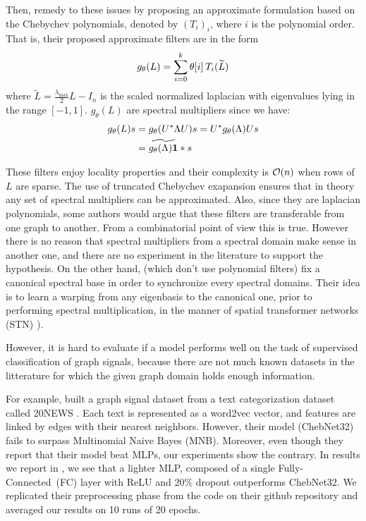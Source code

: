 Then, \cite{defferrard2016convolutional} remedy to these issues by proposing an approximate formulation based on the Chebychev polynomials, denoted by $(T_i)_i$, where $i$ is the polynomial order.
That is, their proposed approximate filters are in the form
\begin{gather}
g_\theta(L) = \sum_{i=0}^k \theta[i] \h{2} T_i(\widetilde{L})
\end{gather}
where $\widetilde{L} = \frac{\lambda_{\max}}2L - I_n$ is the scaled normalized laplacian with eigenvalues lying in the range $[-1,1]$. $g_\theta(L)$ are spectral multipliers since we have:
\begin{align}
g_\theta(L)s &= g_\theta(U^*\Lambda U)s
= U^* g_\theta(\Lambda) Us\nonumber\\
&= \widetilde{g_\theta(\Lambda) \textbf1} \ast s
\end{align}

These filters enjoy locality properties and their complexity is $\co(n)$ when rows of $L$ are sparse. The use of truncated Chebychev exapansion \citep{hammond2011wavelets} ensures that in theory any set of spectral multipliers can be approximated. Also, since they are laplacian polynomials, some authors would argue that these filters are transferable from one graph to another. From a combinatorial point of view this is true. However there is no reason that spectral multipliers from a spectral domain make sense in another one, and there are no experiment in the literature to support the hypothesis. On the other hand, \citep{yi2016syncspeccnn} (which don't use polynomial filters) fix a canonical spectral base in order to synchronize every spectral domains. Their idea is to learn a warping from any eigenbasis to the canonical one, prior to performing spectral multiplication, in the manner of spatial transformer networks (STN) \cite{jaderberg2015spatial}).

However, it is hard to evaluate if a model performs well on the task of supervised classification of graph signals, because there are not much known datasets in the litterature for which the given graph domain holds enough information.

For example, \citeauthor{defferrard2016convolutional} built a graph signal dataset from a text categorization dataset called 20NEWS \citep{joachims1996probabilistic}. Each text is represented as a word2vec vector, and features are linked by edges with their nearest neighbors. However, their model (ChebNet32) fails to surpass Multinomial Naive Bayes (MNB). Moreover, even though they report that their model beat MLPs, our experiments show the contrary. In results we report in , we see that a lighter MLP, composed of a single Fully-Connected~(FC) layer with ReLU and 20\% dropout outperforms ChebNet32. We replicated their preprocessing phase from the code on their github repository and averaged our results on 10 runs of 20 epochs.

